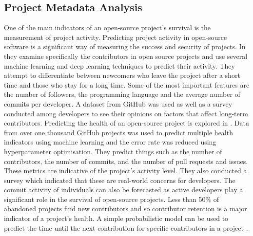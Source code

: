 \documentclass[conference]{IEEEtran}
\begin{document}
\subsection{Project Metadata Analysis}
One of the main indicators of an open-source project's survival is the measurement of project activity. Predicting project activity in open-source software is a significant way of measuring the success and security of projects. In \cite{l_bao_large_2021} they examine specifically the contributors in open source projects and use several machine learning and deep learning techniques to predict their activity. They attempt to differentiate between newcomers who leave the project after a short time and those who stay for a long time. Some of the most important features are the number of followers, the programming language and the average number of commits per developer. A dataset from GitHub was used as well as a survey conducted among developers to see their opinions on factors that affect long-term contributors. Predicting the health of an open-source project is explored in \cite{xia_predicting_2022}. Data from over one thousand GitHub projects was used to predict multiple health indicators using machine learning and the error rate was reduced using hyperparameter optimisation. They predict things such as the number of contributors, the number of commits, and the number of pull requests and issues. These metrics are indicative of the project’s activity level. They also conducted a survey which indicated that these are real-world concerns for developers. The commit activity of individuals can also be forecasted as active developers play a significant role in the survival of open-source projects. Less than 50\% of abandoned projects find new contributors and so contributor retention is a major indicator of a project's health. A simple probabilistic model can be used to predict the time until the next contribution for specific contributors in a project \cite{decan_gap_2020}.
\end{document}
